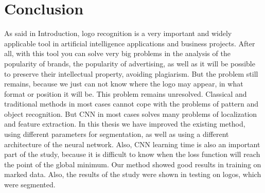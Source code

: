 \chapter{Conclusion}\label{ch:F}
\par As said in Introduction, logo recognition is a very important and widely applicable tool in artificial intelligence applications and business projects. After all, with this tool you can solve very big problems in the analysis of the popularity of brands, the popularity of advertising, as well as it will be possible to preserve their intellectual property, avoiding plagiarism. But the problem still remains, because we just can not know where the logo may appear, in what format or position it will be. This problem remains unresolved. Classical and traditional methods in most cases cannot cope with the problems of pattern and object recognition. But CNN in most cases solves many problems of localization and feature extraction. In this thesis we have improved the existing method, using different parameters for segmentation, as well as using a different architecture of the neural network. Also, CNN learning time is also an important part of the study, because it is difficult to know when the loss function will reach the point of the global minimum. Our method showed good results in training on marked data. Also, the results of the study were shown in testing on logos, which were segmented.
